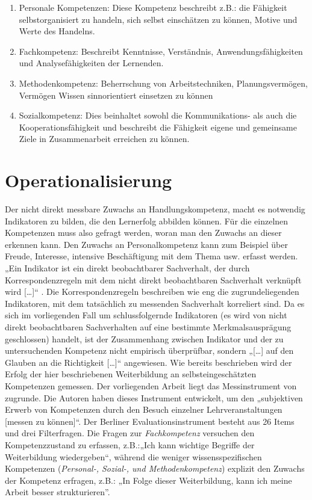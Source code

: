 \documentclass[12pt, bibliography=totoc]{scrartcl}
\begin{document}
\begin{enumerate}
\def\labelenumi{\arabic{enumi}.}
\item
  Personale Kompetenzen: Diese Kompetenz beschreibt z.B.: die Fähigkeit
  selbstorganisiert zu handeln, sich selbst einschätzen zu können,
  Motive und Werte des Handelns.
\item
  Fachkompetenz: Beschreibt Kenntnisse, Verständnis,
  Anwendungsfähigkeiten und Analysefähigkeiten der Lernenden.
\item
  Methodenkompetenz: Beherrschung von Arbeitstechniken,
  Planungsvermögen, Vermögen Wissen sinnorientiert einsetzen zu können
\item
  Sozialkompetenz: Dies beinhaltet sowohl die Kommunikations- als auch
  die Kooperationsfähigkeit und beschreibt die Fähigkeit eigene und
  gemeinsame Ziele in Zusammenarbeit erreichen zu können.
\end{enumerate}

\section{Operationalisierung}\label{operationalisierung}

Der nicht direkt messbare Zuwachs an Handlungskompetenz, macht es
notwendig Indikatoren zu bilden, die den Lernerfolg abbilden können. Für
die einzelnen Kompetenzen muss also gefragt werden, woran man den
Zuwachs an dieser erkennen kann. Den Zuwachs an Personalkompetenz kann
zum Beispiel über Freude, Interesse, intensive Beschäftigung mit dem
Thema usw. erfasst werden. „Ein Indikator ist ein direkt beobachtbarer
Sachverhalt, der durch Korrespondenzregeln mit dem nicht direkt
beobachtbaren Sachverhalt verknüpft wird {[}\ldots{]}``
\parencite[85]{Kromrey2009}. Die Korrespondenzregeln beschreiben wie eng
die zugrundeliegenden Indikatoren, mit dem tatsächlich zu messenden
Sachverhalt korreliert sind. Da es sich im vorliegenden Fall um
schlussfolgernde Indikatoren (es wird von nicht direkt beobachtbaren
Sachverhalten auf eine bestimmte Merkmalsausprägung geschlossen)
handelt, ist der Zusammenhang zwischen Indikator und der zu
untersuchenden Kompetenz nicht empirisch überprüfbar, sondern
„{[}\ldots{]} auf den Glauben an die Richtigkeit {[}\ldots{]}``
\parencite[166]{Kromrey2009} angewiesen. Wie bereits beschrieben wird
der Erfolg der hier beschriebenen Weiterbildung an selbsteingeschätzten
Kompetenzen gemessen. Der vorliegenden Arbeit liegt das Messinstrument
von \textcite{Braun2008} zugrunde. Die Autoren haben dieses Instrument
entwickelt, um den „subjektiven Erwerb von Kompetenzen durch den Besuch
einzelner Lehrveranstaltungen {[}messen zu
können{]}``\parencite[30]{Braun2008a}. Der Berliner
Evaluationsinstrument besteht aus 26 Items und drei Filterfragen. Die
Fragen zur \emph{Fachkompetenz} versuchen den Kompetenzzustand zu
erfassen, z.B.:„Ich kann wichtige Begriffe der Weiterbildung
wiedergeben\enquote{, während die weniger wissensspezifischen
Kompetenzen (\emph{Personal-, Sozial-, und Methodenkompetenz}) explizit
den Zuwachs der Kompetenz erfragen, z.B.: „In Folge dieser
Weiterbildung, kann ich meine Arbeit besser strukturieren}.
\end{document}
